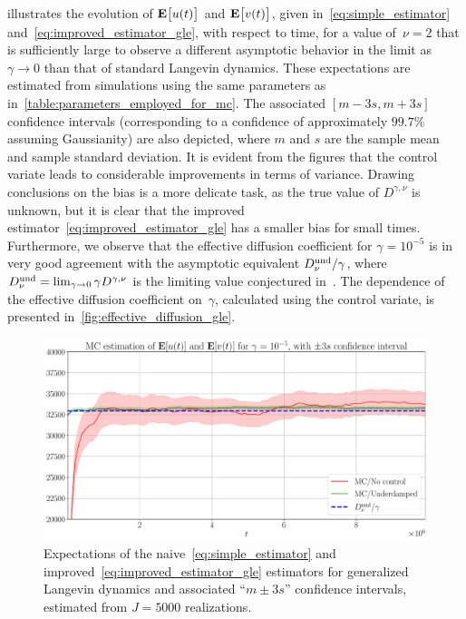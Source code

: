 \documentclass[11pt,a4paper]{article}
\begin{document}
 illustrates the evolution of $\mathbf{E} \bigl[ u(t) \bigr]$ and $\mathbf{E} \bigl[ v(t) \bigr]$,
given in~\eqref{eq:simple_estimator} and~\eqref{eq:improved_estimator_gle},
with respect to time,
for a value of~$\nu = 2$ that is sufficiently large to observe a different asymptotic behavior in the limit as $\gamma \to 0$ than that of standard Langevin dynamics.
These expectations are estimated from simulations using the same parameters as in~\cref{table:parameters_employed_for_mc}.
The associated $[m - 3 s, m + 3 s]$ confidence intervals (corresponding to a confidence of approximately $99.7\%$ assuming Gaussianity) are also depicted,
where $m$ and $s$ are the sample mean and sample standard deviation.
It is evident from the figures that the control variate leads to considerable improvements in terms of variance.
Drawing conclusions on the bias is a more delicate task,
as the true value of $D^{\gamma, \nu}$ is unknown,
but it is clear that the improved estimator~\eqref{eq:improved_estimator_gle} has a smaller bias for small times.
Furthermore, we observe that the effective diffusion coefficient for $\gamma = 10^{-5}$
is in very good agreement with the asymptotic equivalent $D^{\rm und}_{\nu}/\gamma$,
where $D^{\rm und}_{\nu} = \lim_{\gamma \to 0} \gamma D^{\gamma, \nu}$ is the limiting value conjectured in~\cite{GPGSUV21}.
The dependence of the effective diffusion coefficient on~$\gamma$,
calculated using the control variate, is presented in~\cref{fig:effective_diffusion_gle}.
\begin{figure}[ht]
    \centering
    \includegraphics[width=0.8\linewidth]{figures/time-gle-5.pdf}
    \caption{%
        Expectations of the naive~\eqref{eq:simple_estimator} and improved~\eqref{eq:improved_estimator_gle} estimators for generalized Langevin dynamics
        and associated ``$m \pm 3 s$'' confidence intervals,
        estimated from $J = 5000$ realizations.
    }
    \label{fig:effective_diffusion_time_gle}
\end{figure}
\end{document}
